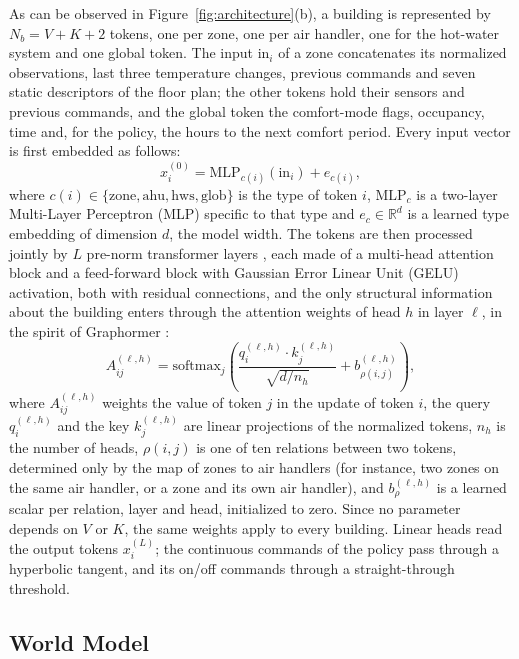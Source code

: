 \documentclass{article}
\begin{document}
As can be observed in Figure~\ref{fig:architecture}(b), a building is represented by $N_b = V + K + 2$ tokens, one per zone, one per air handler, one for the hot-water system and one global token. The input $\mathrm{in}_i$ of a zone concatenates its normalized observations, last three temperature changes, previous commands and seven static descriptors of the floor plan; the other tokens hold their sensors and previous commands, and the global token the comfort-mode flags, occupancy, time and, for the policy, the hours to the next comfort period. Every input vector is first embedded as follows:
\begin{equation}
x^{(0)}_i = \mathrm{MLP}_{c(i)}(\mathrm{in}_i) + e_{c(i)} ,
\label{eq:tokens}
\end{equation}
where $c(i) \in \{\mathrm{zone}, \mathrm{ahu}, \mathrm{hws}, \mathrm{glob}\}$ is the type of token $i$, $\mathrm{MLP}_c$ is a two-layer Multi-Layer Perceptron (MLP) specific to that type and $e_c \in \mathbb{R}^d$ is a learned type embedding of dimension $d$, the model width. The tokens are then processed jointly by $L$ pre-norm transformer layers \cite{vaswani2017attention}, each made of a multi-head attention block and a feed-forward block with Gaussian Error Linear Unit (GELU) activation, both with residual connections, and the only structural information about the building enters through the attention weights of head $h$ in layer $\ell$, in the spirit of Graphormer \cite{ying2021graphormer}:
\begin{equation}
A^{(\ell,h)}_{ij} = \mathrm{softmax}_j\!\left( \frac{q^{(\ell,h)}_i \cdot k^{(\ell,h)}_j}{\sqrt{d/n_h}} + b^{(\ell,h)}_{\rho(i,j)} \right),
\label{eq:attention}
\end{equation}
where $A^{(\ell,h)}_{ij}$ weights the value of token $j$ in the update of token $i$, the query $q^{(\ell,h)}_i$ and the key $k^{(\ell,h)}_j$ are linear projections of the normalized tokens, $n_h$ is the number of heads, $\rho(i,j)$ is one of ten relations between two tokens, determined only by the map of zones to air handlers (for instance, two zones on the same air handler, or a zone and its own air handler), and $b^{(\ell,h)}_{\rho}$ is a learned scalar per relation, layer and head, initialized to zero. Since no parameter depends on $V$ or $K$, the same weights apply to every building. Linear heads read the output tokens $x^{(L)}_i$; the continuous commands of the policy pass through a hyperbolic tangent, and its on/off commands through a straight-through threshold.

\subsection{World Model}
\label{sec:wm}
\end{document}
